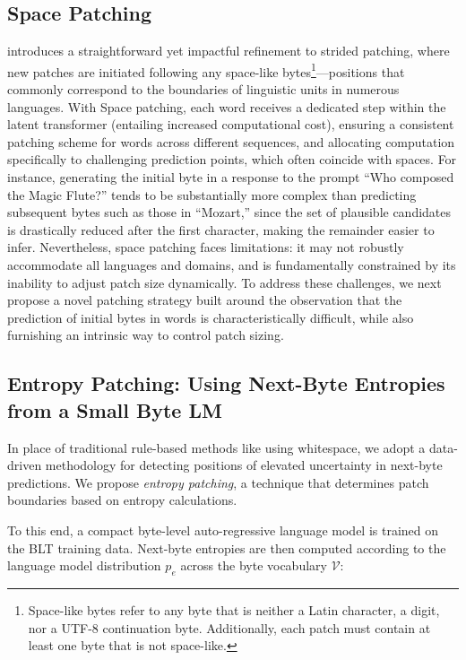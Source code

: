 \subsection{Space Patching}
\label{section:white-patch}

\citet{slagle2024spacebyte} introduces a straightforward yet impactful refinement to strided patching, where new patches are initiated following any space-like bytes\footnote{
    Space-like bytes refer to any byte that is neither a Latin character, a digit, nor a UTF-8 continuation byte. Additionally, each patch must contain at least one byte that is not space-like. }—positions that commonly correspond to the boundaries of linguistic units in numerous languages. With Space patching, each word receives a dedicated step within the latent transformer (entailing increased computational cost), ensuring a consistent patching scheme for words across different sequences, and allocating computation specifically to challenging prediction points, which often coincide with spaces. For instance, generating the initial byte in a response to the prompt ``Who composed the Magic Flute?\uline{\hspace{.6em}}'' tends to be substantially more complex than predicting subsequent bytes such as those in ``Mozart,'' since the set of plausible candidates is drastically reduced after the first character, making the remainder easier to infer. Nevertheless, space patching faces limitations: it may not robustly accommodate all languages and domains, and is fundamentally constrained by its inability to adjust patch size dynamically. To address these challenges, we next propose a novel patching strategy built around the observation that the prediction of initial bytes in words is characteristically difficult, while also furnishing an intrinsic way to control patch sizing.

\subsection{Entropy Patching: Using Next-Byte Entropies from a Small Byte LM}
\label{section:dyn-patch}

In place of traditional rule-based methods like using whitespace, we adopt a data-driven methodology for detecting positions of elevated uncertainty in next-byte predictions. We propose \textit{entropy patching}, a technique that determines patch boundaries based on entropy calculations.

To this end, a compact byte-level auto-regressive language model is trained on the {\textsc BLT} training data. Next-byte entropies are then computed according to the language model distribution $p_{e}$ across the byte vocabulary $\mathcal{V}$:

